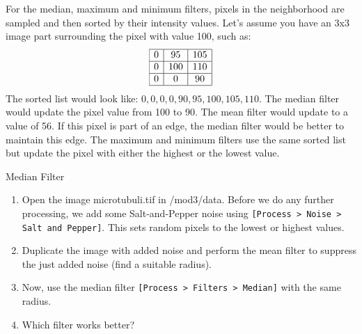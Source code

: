 For the median, maximum and minimum filters, pixels in the neighborhood are sampled and then sorted by their intensity values. Let's assume you have an 3x3 image part surrounding the pixel with value 100, such as:
	\[
		\begin{array}{|c|c|c|}
	\hline
	0&95&105\\
\hline
0&100&110\\
\hline
0&0&90\\
\hline
	\end{array}
\]
 The sorted list would look like: $0,0,0,0,90,95,100,105,110$. The median filter would update the pixel value from 100 to 90. The mean filter would update to a value of 56. If this pixel is part of an edge, the median filter would be better to maintain this edge. The maximum and minimum filters use the same sorted list but update the pixel with either the highest or the lowest value.

\begin{taskbox}{Median Filter}
\begin{enumerate}
	\item Open the image microtubuli.tif in /mod3/data. Before we do any further processing, we add some Salt-and-Pepper noise using \texttt{[Process > Noise > Salt and Pepper]}. This sets random pixels to the lowest or highest values.
	\item Duplicate the image with added noise and perform the mean filter to suppress the just added noise (find a suitable radius).
	\item Now, use the median filter \texttt{[Process > Filters > Median]} with the same radius.
	\item Which filter works better?
	\end{enumerate}
\end{taskbox}

